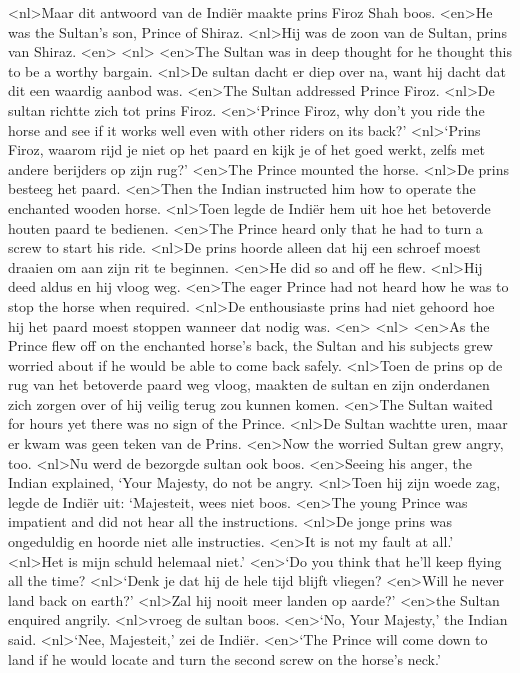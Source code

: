 <nl>Maar dit antwoord van de Indi\"er maakte prins Firoz Shah boos.
<en>He was the Sultan's son, Prince of Shiraz.
<nl>Hij was de zoon van de Sultan, prins van Shiraz.
<en>
<nl>
<en>The Sultan was in deep thought for he thought this to be a worthy bargain.
<nl>De sultan dacht  er diep over na, want hij dacht dat dit een waardig aanbod was.
<en>The Sultan addressed Prince Firoz.
<nl>De sultan richtte zich tot prins Firoz.
<en>`Prince Firoz, why don't you ride the horse and see if it works well even with other riders on its back?'
<nl>`Prins Firoz, waarom rijd je niet op het paard en kijk je of het goed werkt, zelfs met andere berijders op zijn rug?'
<en>The Prince mounted the horse.
<nl>De prins besteeg het paard.
<en>Then the Indian instructed him how to operate the enchanted wooden horse.
<nl>Toen legde de Indi\"er  hem uit hoe het betoverde houten paard te bedienen.
<en>The Prince heard only that he had to turn a screw to start his ride.
<nl>De prins hoorde alleen dat hij een schroef moest draaien om aan zijn rit te beginnen.
<en>He did so and off he flew.
<nl>Hij deed aldus en hij vloog weg.
<en>The eager Prince had not heard how he was to stop the horse when required.
<nl>De enthousiaste prins had niet gehoord hoe hij het paard moest stoppen wanneer dat nodig was.
<en>
<nl>
<en>As the Prince flew off on the enchanted horse's back, the Sultan and his subjects grew worried about if he would be able to come back safely.
<nl>Toen de prins op de rug van het betoverde paard weg vloog, maakten de sultan en zijn onderdanen zich zorgen over of hij veilig terug zou kunnen komen.
<en>The Sultan waited for hours yet there was no sign of the Prince.
<nl>De Sultan wachtte uren, maar er kwam was geen teken van de Prins.
<en>Now the worried Sultan grew angry, too.
<nl>Nu werd de bezorgde sultan ook boos.
<en>Seeing his anger, the Indian explained, `Your Majesty, do not be angry.
<nl>Toen hij zijn woede zag, legde de Indi\"er uit: `Majesteit, wees niet boos.
<en>The young Prince was impatient and did not hear all the instructions.
<nl>De jonge prins was ongeduldig en hoorde niet alle instructies.
<en>It is not my fault at all.'
<nl>Het is mijn schuld helemaal niet.'
<en>`Do you think that he'll keep flying all the time?
<nl>`Denk je dat hij de hele tijd blijft vliegen?
<en>Will he never land back on earth?'
<nl>Zal hij nooit meer landen op aarde?'
<en>the Sultan enquired angrily.
<nl>vroeg de sultan boos.
<en>`No, Your Majesty,' the Indian said.
<nl>`Nee, Majesteit,' zei de Indi\"er.
<en>`The Prince will come down to land if he would locate and turn the second screw on the horse's neck.'
